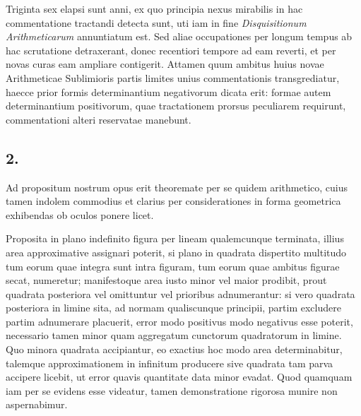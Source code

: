 \documentclass[12pt]{article}
\begin{document}
Triginta sex elapsi sunt anni, ex quo principia nexus mirabilis in hac commentatione tractandi detecta sunt, uti iam in fine \emph{Disquisitionum Arithmeticarum} annuntiatum est. Sed aliae occupationes per longum tempus ab hac scrutatione detraxerant, donec recentiori tempore ad eam reverti, et per novas curas eam ampliare contigerit. Attamen quum ambitus huius novae Arithmeticae Sublimioris partis limites unius commentationis transgrediatur, haecce prior formis determinantium negativorum dicata erit: formae autem determinantium positivorum, quae tractationem prorsus peculiarem requirunt, commentationi alteri reservatae manebunt.

\subsection*{2.}

Ad propositum nostrum opus erit theoremate per se quidem arithmetico, cuius tamen indolem commodius et clarius per considerationes in forma geometrica exhibendas ob oculos ponere licet.

Proposita in plano indefinito figura per lineam qualemcunque terminata, illius area approximative assignari poterit, si plano in quadrata dispertito multitudo tum eorum quae integra sunt intra figuram, tum eorum quae ambitus figurae secat, numeretur; manifestoque area iusto minor vel maior prodibit, prout quadrata posteriora vel omittuntur vel prioribus adnumerantur: si vero quadrata posteriora in limine sita, ad normam qualiscunque principii, partim excludere partim adnumerare placuerit, error modo positivus modo negativus esse poterit, necessario tamen minor quam aggregatum cunctorum quadratorum in limine. Quo minora quadrata accipiantur, eo exactius hoc modo area determinabitur, talemque approximationem in infinitum producere sive quadrata tam parva accipere licebit, ut error quavis quantitate data minor evadat. Quod quamquam iam per se evidens esse videatur, tamen demonstratione rigorosa munire non aspernabimur.
\end{document}
